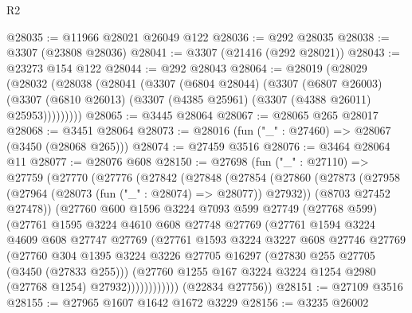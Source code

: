 \begin{lexlean}{R2}
\begin{coremodule}
@28035 := @11966 @28021 @26049 @122
@28036 := @292 @28035
@28038 := @3307 (@23808 @28036)
@28041 := @3307 (@21416 (@292 @28021))
@28043 := @23273 @154 @122
@28044 := @292 @28043
@28064 := @28019
    (@28029
      (@28032
        (@28038
          (@28041
            (@3307
              (@6804 @28044)
              (@3307
                (@6807 @26003)
                (@3307 (@6810 @26013) (@3307 (@4385 @25961) (@3307 (@4388 @26011) @25953)))))))))
@28065 := @3445 @28064
@28067 := @28065 @265 @28017
@28068 := @3451 @28064
@28073 := @28016 (fun ("_" : @27460) => @28067 (@3450 (@28068 @265)))
@28074 := @27459 @3516
@28076 := @3464 @28064 @11
@28077 := @28076 @608
@28150 := @27698
    (fun ("_" : @27110) =>
    @27759
      (@27770
        (@27776
          (@27842
            (@27848
              (@27854
                (@27860
                  (@27873
                    (@27958 (@27964 (@28073 (fun ("_" : @28074) => @28077)) @27932))
                    (@8703 @27452 @27478))
                  (@27760
                    @600
                    @1596
                    @3224
                    @7093
                    @599
                    @27749
                    (@27768 @599)
                    (@27761
                      @1595
                      @3224
                      @4610
                      @608
                      @27748
                      @27769
                      (@27761
                        @1594
                        @3224
                        @4609
                        @608
                        @27747
                        @27769
                        (@27761
                          @1593
                          @3224
                          @3227
                          @608
                          @27746
                          @27769
                          (@27760
                            @304
                            @1395
                            @3224
                            @3226
                            @27705
                            @16297
                            (@27830 @255 @27705 (@3450 (@27833 @255)))
                            (@27760
                              @1255
                              @167
                              @3224
                              @3224
                              @1254
                              @2980
                              (@27768 @1254)
                              @27932))))))))))))
      (@22834 @27756))
@28151 := @27109 @3516
@28155 := @27965 @1607 @1642 @1672 @3229
@28156 := @3235 @26002

\end{coremodule}
\end{lexlean}
